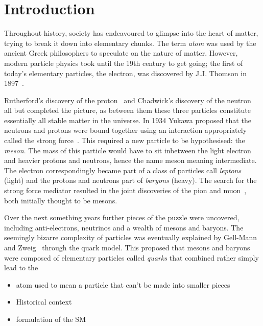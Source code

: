 \chapter{Introduction} 
\label{ch:introduction}

\minitoc 





Throughout history, society has endeavoured to glimpse into the heart of matter, trying to break it down into elementary chunks.
The term \emph{atom} was used by the ancient Greek philosophers to speculate on the nature of matter. 
However, modern particle physics took until the 19th century to get going; the first of today's elementary particles, the electron, was discovered by J.J. Thomson in 1897~\cite{electron}.

Rutherford's discovery of the proton~\cite{Rutherford:1911zz} and Chadwick's discovery of the neutron~\cite{Chadwick:1932ma} all but completed the picture, as between them these three particles constitute essentially all stable matter in the universe.  
In 1934 Yukawa proposed that the neutrons and protons were bound together using an interaction appropriately called the strong force~\cite{193548}. This required a new particle to be hypothesised: the \emph{meson}. The mass of this particle would have to sit inbetween the light electron and heavier  protons and neutrons, hence the name meson meaning intermediate. The electron correspondingly became part of a class of particles call \emph{leptons} (light) and the protons and neutrons part of \emph{baryons} (heavy). 
The search for the strong force mediator resulted in the joint discoveries of the pion and muon~\cite{Lattes:1947mw,Lattes:1947mx}, both initially thought to be mesons. 


Over the next {\color{Red}something} years further pieces of the puzzle were uncovered, including anti-electrons, neutrinos and a wealth of mesons and baryons. 
The seemingly bizarre complexity of particles was eventually explained by Gell-Mann~\cite{GellMann:1964nj} and Zweig~\cite{Zweig:1964jf} through the quark model. This proposed that mesons and baryons were composed of elementary particles called \emph{quarks} that combined rather simply lead to the   


{\color{Red}
\begin{itemize}
\item atom used to mean a particle that can't be made into smaller pieces 
\item Historical context 
\item formulation of the SM
\end{itemize}}





